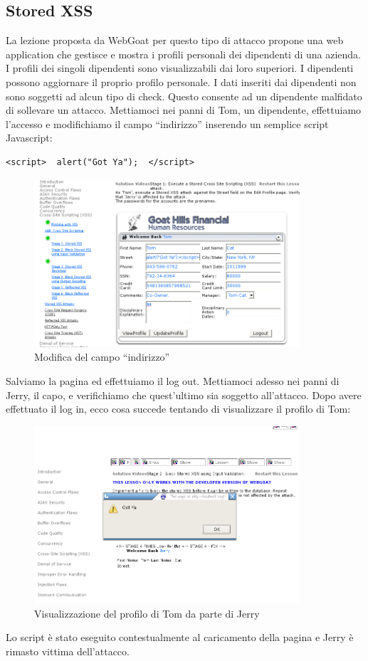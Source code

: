 \documentclass[a4paper,openright,italian]{article}
\begin{document}
\subsection{Stored XSS}\label{storedxss}
La lezione proposta da WebGoat per questo tipo di attacco propone una web application che gestisce e mostra i profili personali dei dipendenti di una azienda. I profili dei singoli dipendenti sono visualizzabili dai loro superiori. I dipendenti possono aggiornare il proprio profilo personale. I dati inseriti dai dipendenti non sono soggetti ad alcun tipo di check. Questo consente ad un dipendente malfidato di sollevare un attacco. Mettiamoci nei panni di Tom, un dipendente, effettuiamo l'accesso e modifichiamo il campo ``indirizzo'' inserendo un semplice script Javascript:
\begin{lstlisting}[caption={Script da inserire nel campo ``indirizzo''}, label={code:tick},frame=trBL]
<script>  alert("Got Ya");  </script>
\end{lstlisting}
\begin{figure}[h]
\centering
\includegraphics[width=280pt]{images/xss_stored_1.png}
\caption{Modifica del campo ``indirizzo''}
\end{figure}
Salviamo la pagina ed effettuiamo il log out. Mettiamoci adesso nei panni di Jerry, il capo, e verifichiamo che quest'ultimo sia soggetto all'attacco. Dopo avere effettuato il log in, ecco cosa succede tentando di visualizzare il profilo di Tom:
\begin{figure}[h]
\centering
\includegraphics[width=280pt]{images/xss_stored_2.png}
\caption{Visualizzazione del profilo di Tom da parte di Jerry}
\end{figure}
\newline Lo script \`e stato eseguito contestualmente al caricamento della pagina e Jerry \`e rimasto vittima dell'attacco.
\end{document}
